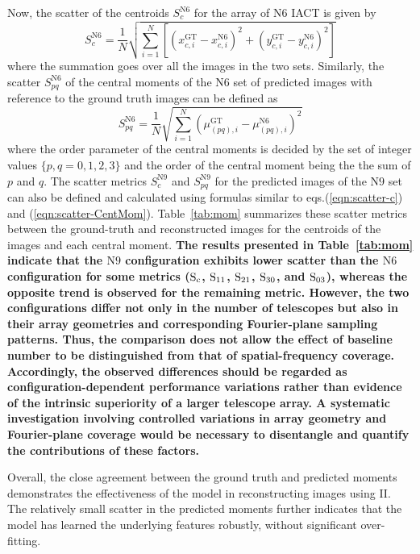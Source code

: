 Now, the scatter of the centroids $S_c^\mathrm{N6}$ for the array of $\mathrm{N6}$ IACT is given by
\begin{equation}
S_c^{\mathrm{N6}} = \frac{1}{N}\sqrt{\sum_{i=1}^N\left[(x_{c,i}^{\mathrm{GT}} - x_{c,i}^{\mathrm{N6}})^2 +(y_{c,i}^{\mathrm{GT}} - y_{c,i}^{\mathrm{N6}})^2 \right]} 
\label{eqn:scatter-c}
\end{equation}    
where the summation goes over all the images in the two sets. Similarly, the scatter $S_{pq}^{\mathrm{N6}}$ of the central moments of the $\mathrm{N6}$ set of predicted images with reference to the ground truth images can be defined as
\begin{equation}
S_{pq}^{\mathrm{N6}} = \frac{1}{N}\sqrt{\sum_{i=1}^N \left(\mu_{(pq),i}^{\mathrm{GT}} - \mu_{(pq),i}^{\mathrm{N6}}\right)^2}
\label{eqn:scatter-CentMom}
\end{equation}
where the order parameter of the central moments is decided by the set of integer values $\{p,q = 0,1,2,3\}$ and the order of the central moment being the the sum of $p$ and $q$. The scatter metrics 
$S_c^\mathrm{N9}$ and $S_{pq}^{\mathrm{N9}}$ for the predicted images of the $\mathrm{N9}$ set can also be defined and calculated using formulas similar to eqs.(\ref{eqn:scatter-c}) and (\ref{eqn:scatter-CentMom}). Table~\ref{tab:mom} summarizes these scatter metrics between the ground-truth and reconstructed images for the centroids of the images and each central moment. 
{\bf The results presented in Table~\ref{tab:mom} indicate that the $\mathrm{N9}$ configuration exhibits lower scatter than the $\mathrm{N6}$ configuration for some metrics ($\rm S_c$, $\rm S_{11}$, $\rm S_{21}$, $\rm S_{30}$, and $\rm S_{03}$), whereas the opposite trend is observed for the remaining metric. However, the two configurations differ not only in the number of telescopes but also in their array geometries and corresponding Fourier-plane sampling patterns. Thus, the comparison does not allow the effect of baseline number to be distinguished from that of spatial-frequency coverage. Accordingly, the observed differences should be regarded as configuration-dependent performance variations rather than evidence of the intrinsic superiority of a larger telescope array. A systematic investigation involving controlled variations in array geometry and Fourier-plane coverage would be necessary to disentangle and quantify the contributions of these factors.}

Overall, the close agreement between the ground truth and predicted moments demonstrates the effectiveness of the model in reconstructing images using II. The relatively small scatter in the predicted moments further indicates that the model has learned the underlying features robustly, without significant over-fitting.

